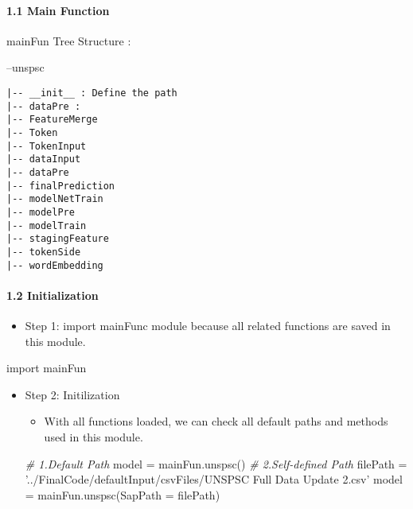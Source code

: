 \documentclass[11pt]{article}
\providecommand{\tightlist}{%
      \setlength{\itemsep}{0pt}\setlength{\parskip}{0pt}}
\newenvironment{Shaded}{}{}
\newcommand{\StringTok}[1]{\textcolor[rgb]{0.25,0.44,0.63}{{#1}}}
\newcommand{\CommentTok}[1]{\textcolor[rgb]{0.38,0.63,0.69}{\textit{{#1}}}}
\newcommand{\NormalTok}[1]{{#1}}
\newcommand{\ImportTok}[1]{{#1}}
\newcommand{\OperatorTok}[1]{\textcolor[rgb]{0.40,0.40,0.40}{{#1}}}
\begin{document}
    \hypertarget{main-function}{%
\paragraph{1.1 Main Function}\label{main-function}}

    mainFun Tree Structure :

--unspsc

\begin{verbatim}
|-- __init__ : Define the path
|-- dataPre :
|-- FeatureMerge
|-- Token
|-- TokenInput
|-- dataInput
|-- dataPre
|-- finalPrediction
|-- modelNetTrain
|-- modelPre
|-- modelTrain
|-- stagingFeature
|-- tokenSide
|-- wordEmbedding 
\end{verbatim}

    \hypertarget{initialization}{%
\paragraph{1.2 Initialization}\label{initialization}}

    \begin{itemize}
\tightlist
\item
  Step 1: import mainFunc module because all related functions are saved
  in this module.
\end{itemize}

\begin{Shaded}
\begin{Highlighting}[]
\ImportTok{import}\NormalTok{ mainFun}
\end{Highlighting}
\end{Shaded}

\begin{itemize}
\tightlist
\item
  Step 2: Initilization

  \begin{itemize}
  \tightlist
  \item
    With all functions loaded, we can check all default paths and
    methods used in this module.
  \end{itemize}

\begin{Shaded}
\begin{Highlighting}[]
\CommentTok{# 1.Default Path}
\NormalTok{model }\OperatorTok{=}\NormalTok{ mainFun.unspsc() }
\CommentTok{# 2.Self-defined Path}
\NormalTok{filePath }\OperatorTok{=} \StringTok{'../FinalCode/defaultInput/csvFiles/UNSPSC Full Data Update 2.csv'}
\NormalTok{model }\OperatorTok{=}\NormalTok{ mainFun.unspsc(SapPath }\OperatorTok{=}\NormalTok{ filePath) }
\end{Highlighting}
\end{Shaded}
\end{itemize}
\end{document}
